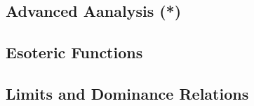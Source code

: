 \subsection{Advanced Aanalysis (*)}

\subsection{Esoteric Functions}

\subsection{Limits and Dominance Relations}